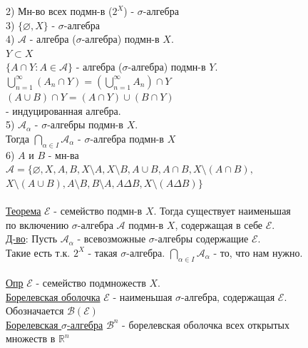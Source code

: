 \documentclass{article}
\begin{document}
2) Мн-во всех подмн-в ($2^X$) - $\sigma$-алгебра \\
3) $\{\varnothing, X\}$ - $\sigma$-алгебра \\
4) $\mathcal{A}$ - алгебра ($\sigma$-алгебра) подмн-в $X$. \\
\hspace*{1cm} $Y \subset X$ \\
\hspace*{1cm} $\{A \cap Y : A \in \mathcal{A}\}$ - алгебра ($\sigma$-алгебра) подмн-в $Y$. \\
\hspace*{1cm} $\bigcup_{n=1}^{\infty}(A_n \cap Y) = (\bigcup_{n=1}^{\infty} A_n) \cap Y$ \\
\hspace*{1cm} $(A \cup B) \cap Y = (A \cap Y) \cup (B \cap Y)$ \\
\hspace*{1cm} - индуцированная алгебра. \\
5) $\mathcal{A}_\alpha$ - $\sigma$-алгебры подмн-в $X$. \\
Тогда $\bigcap_{\alpha \in I} \mathcal{A}_\alpha$ - $\sigma$-алгебра подмн-в $X$ \\
6) $A$ и $B$ - мн-ва \\
\hspace*{2.5cm} $\mathcal{A} = \{\varnothing, X, A, B, X \setminus A, X \setminus B, A \cup B, A \cap B, X \setminus (A \cap B),$ \\
\hspace*{3cm} $X \setminus (A \cup B), A \setminus B, B \setminus A, A \Delta B, X \setminus (A \Delta B)\}$ \\
\\
\underline{Теорема} $\mathcal{E}$ - семейство подмн-в $X$. Тогда существует наименьшая \\
\hspace*{1cm} по включению $\sigma$-алгебра $\mathcal{A}$ подмн-в $X$, содержащая в себе $\mathcal{E}$. \\
\underline{Д-во}: Пусть $\mathcal{A}_\alpha$ - всевозможные $\sigma$-алгебры содержащие $\mathcal{E}$. \\
Такие есть т.к. $2^X$ - такая $\sigma$-алгебра. $\bigcap_{\alpha \in I} \mathcal{A}_\alpha$ - то, что нам нужно. \\
\\
\underline{Опр} $\mathcal{E}$ - семейство подмножеств $X$. \\
\hspace*{1cm} \underline{Борелевская оболочка} $\mathcal{E}$ - наименьшая $\sigma$-алгебра, содержащая $\mathcal{E}$. \\
\hspace*{5cm} Обозначается $\mathcal{B}(\mathcal{E})$ \\
\hspace*{1cm} \underline{Борелевская $\sigma$-алгебра} $\mathcal{B}^n$ - борелевская оболочка всех открытых \\
\hspace*{5cm} множеств в $\mathbb{R}^n$
\end{document}
